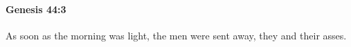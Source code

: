 
		\paragraph{Genesis 44:3} %
			\label{GENESIS-44-3}

			As soon as the morning was light, the men were sent away, they and their asses.


